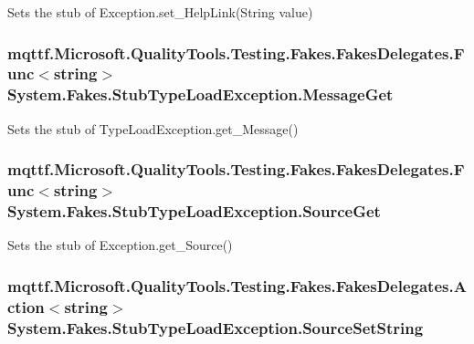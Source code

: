 Sets the stub of Exception.\-set\-\_\-\-Help\-Link(\-String value)

\hypertarget{class_system_1_1_fakes_1_1_stub_type_load_exception_a3c35d443dab902c4087438cc481162d6}{
\subsubsection[{Message\-Get}]{\setlength{\rightskip}{0pt plus 5cm}mqttf.\-Microsoft.\-Quality\-Tools.\-Testing.\-Fakes.\-Fakes\-Delegates.\-Func$<$string$>$ System.\-Fakes.\-Stub\-Type\-Load\-Exception.\-Message\-Get}}\label{class_system_1_1_fakes_1_1_stub_type_load_exception_a3c35d443dab902c4087438cc481162d6}


Sets the stub of Type\-Load\-Exception.\-get\-\_\-\-Message()

\hypertarget{class_system_1_1_fakes_1_1_stub_type_load_exception_a1fe012d44d2a8a578488ad5b034af81f}{
\subsubsection[{Source\-Get}]{\setlength{\rightskip}{0pt plus 5cm}mqttf.\-Microsoft.\-Quality\-Tools.\-Testing.\-Fakes.\-Fakes\-Delegates.\-Func$<$string$>$ System.\-Fakes.\-Stub\-Type\-Load\-Exception.\-Source\-Get}}\label{class_system_1_1_fakes_1_1_stub_type_load_exception_a1fe012d44d2a8a578488ad5b034af81f}


Sets the stub of Exception.\-get\-\_\-\-Source()

\hypertarget{class_system_1_1_fakes_1_1_stub_type_load_exception_adc83783524e0ba01d85ac12622f59b34}{
\subsubsection[{Source\-Set\-String}]{\setlength{\rightskip}{0pt plus 5cm}mqttf.\-Microsoft.\-Quality\-Tools.\-Testing.\-Fakes.\-Fakes\-Delegates.\-Action$<$string$>$ System.\-Fakes.\-Stub\-Type\-Load\-Exception.\-Source\-Set\-String}}\label{class_system_1_1_fakes_1_1_stub_type_load_exception_adc83783524e0ba01d85ac12622f59b34}


